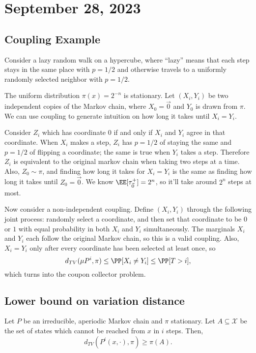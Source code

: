 \section{September 28, 2023}

\subsection{Coupling Example}

\begin{example}
\exlabel

Consider a lazy random walk on a hypercube, where ``lazy'' means that each step stays in the same place with $p=1/2$ and otherwise travels to a uniformly randomly selected neighbor with $p=1/2$. 
\end{example}

The uniform distribution $\pi(x) = 2^{-n}$ is stationary. Let $(X_i, Y_i)$ be two independent copies of the Markov chain, where $X_0=\vec{0}$ and $Y_0$ is drawn from $\pi$. We can use coupling to generate intuition on how long it takes until $X_i=Y_i$.

Consider $Z_i$ which has coordinate $0$ if and only if $X_i$ and $Y_i$ agree in that coordinate. When $X_i$ makes a step, $Z_i$ has $p=1/2$ of staying the same and $p=1/2$ of flipping a coordinate; the same is true when $Y_i$ takes a step. Therefore $Z_i$ is equivalent to the original markov chain when taking two steps at a time. Also, $Z_0\sim \pi$, and finding how long it takes for $X_i=Y_i$ is the same as finding how long it takes until $Z_0=\vec{0}$. We know $\EE[\tau_{\vec{0}}^+]=2^n$, so it'll take around $2^n$ steps at most. 

Now consider a non-independent coupling. Define $(X_i,Y_i)$ through the following joint process: randomly select a coordinate, and then set that coordinate to be $0$ or $1$ with equal probability in both $X_i$ and $Y_i$ simultaneously. The marginals $X_i$ and $Y_i$ each follow the original Markov chain, so this is a valid coupling. Also, $X_i=Y_i$ only after every coordinate has been selected at least once, so 
\[d_{TV}(\mu P^i, \pi)\leq \PP[X_i\neq Y_i] \leq \PP[T > i],\]
which turns into the coupon collector problem. 

\subsection{Lower bound on variation distance}

\begin{theorem}
\proplabel

Let $P$ be an irreducible, aperiodic Markov chain and $\pi$ stationary. Let $A\subseteq \mathcal{X}$ be the set of states which cannot be reached from $x$ in $i$ steps. Then, 
\[d_{TV}(P^i(x, \cdot),\pi)\geq \pi(A).\]
\end{theorem}

